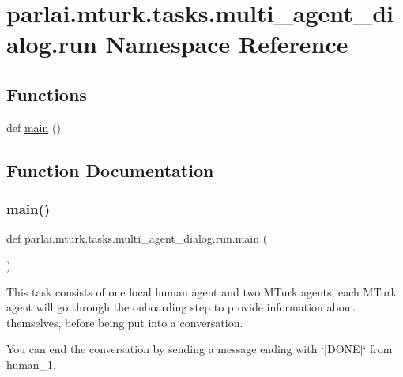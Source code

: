 \hypertarget{namespaceparlai_1_1mturk_1_1tasks_1_1multi__agent__dialog_1_1run}{}\section{parlai.\+mturk.\+tasks.\+multi\+\_\+agent\+\_\+dialog.\+run Namespace Reference}
\label{namespaceparlai_1_1mturk_1_1tasks_1_1multi__agent__dialog_1_1run}
\subsection*{Functions}
\begin{DoxyCompactItemize}
\item 
def \hyperlink{namespaceparlai_1_1mturk_1_1tasks_1_1multi__agent__dialog_1_1run_ab60f6ad04de7f9c7192cdaec99b441d9}{main} ()
\end{DoxyCompactItemize}


\subsection{Function Documentation}
\mbox{\label{namespaceparlai_1_1mturk_1_1tasks_1_1multi__agent__dialog_1_1run_ab60f6ad04de7f9c7192cdaec99b441d9}} 
\subsubsection{\texorpdfstring{main()}{main()}}
{\footnotesize\ttfamily def parlai.\+mturk.\+tasks.\+multi\+\_\+agent\+\_\+dialog.\+run.\+main (\begin{DoxyParamCaption}{ }\end{DoxyParamCaption})}

\begin{DoxyVerb}This task consists of one local human agent and two MTurk agents, each MTurk agent
will go through the onboarding step to provide information about themselves, before
being put into a conversation.

You can end the conversation by sending a message ending with `[DONE]` from human_1.
\end{DoxyVerb}
 

